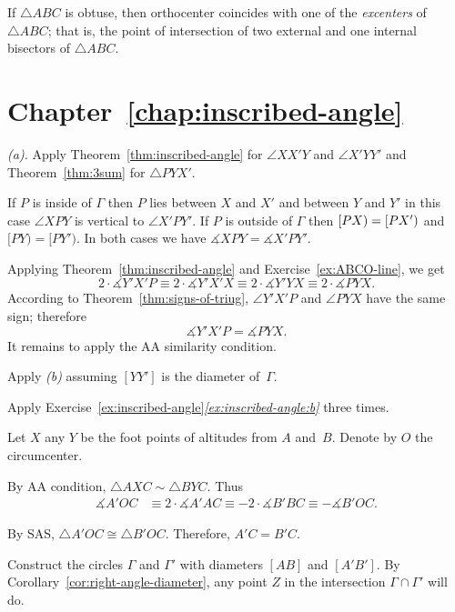 If $\triangle ABC$ is obtuse, then orthocenter coincides with one of the \emph{excenters} of $\triangle ABC$;
that is, 
the point of intersection of two external and one internal bisectors of $\triangle ABC$.
 

 

\section*{Chapter~\ref{chap:inscribed-angle}}
\setcounter{eqtn}{0}

 \textit{(a).}
Apply Theorem~\ref{thm:inscribed-angle} for $\angle XX'Y$ and $\angle X'YY'$
and Theorem~\ref{thm:3sum} for $\triangle PYX'$.

 If $P$ is inside of $\Gamma$ then $P$ lies between $X$ and $X'$ and between $Y$ and $Y'$ in this case $\angle XPY$ is vertical to $\angle X'PY'$.
If $P$ is outside of $\Gamma$ then $[PX)\z=[PX')$ and $[PY)=[PY')$.
In both cases we have $\measuredangle XPY=\measuredangle X'PY'$.

Applying Theorem~\ref{thm:inscribed-angle} and Exercise~\ref{ex:ABCO-line}, we get
\[2\cdot \measuredangle Y'X'P
\equiv
2\cdot \measuredangle Y'X'X 
\equiv
2\cdot\measuredangle Y'YX
\equiv
2\cdot\measuredangle PYX.\]
According to Theorem~\ref{thm:signs-of-triug}, $\angle Y'X'P$ and $\angle PYX$ have the same sign;
therefore
$$\measuredangle Y'X'P= \measuredangle PYX.$$
It remains to apply the AA similarity condition.

 Apply \textit{(b)} assuming $[YY']$ is the diameter of~$\Gamma$. 

 Apply Exercise~\ref{ex:inscribed-angle}\textit{\ref{ex:inscribed-angle:b}}
three times.

Let $X$ any $Y$ be the foot points of altitudes from $A$ and~$B$.
Denote by $O$ the circumcenter.
 
By AA condition, $\triangle A X C\sim \triangle B Y C$.
Thus 
\begin{align*}
\measuredangle A'OC
&\equiv 
2\cdot \measuredangle A' A C
\equiv-2\cdot\measuredangle B' B C
\equiv-\measuredangle B'OC.
\end{align*}


By SAS, $\triangle A'OC\cong\triangle B'OC$.
Therefore, $A'C=B'C$.

Construct the circles $\Gamma$ and $\Gamma'$
with diameters $[AB]$ and $[A'B']$.
By Corollary~\ref{cor:right-angle-diameter},
any point $Z$ in the intersection $\Gamma\cap \Gamma'$ will do.

